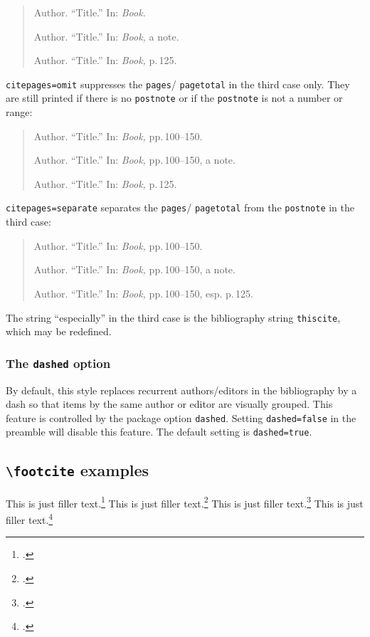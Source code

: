 \documentclass[a4paper]{article}
\newcommand{\cmd}[1]{\texttt{\textbackslash #1}}
\begin{document}
\begin{quote}
Author. \enquote{Title.} In: \emph{Book.}

Author. \enquote{Title.} In: \emph{Book,} a note.

Author. \enquote{Title.} In: \emph{Book,} p.\,125.
\end{quote}
%
\texttt{citepages=omit} suppresses the \texttt{pages}\slash
\texttt{pagetotal} in the third case only. They are still printed if
there is no \texttt{postnote} or if the \texttt{postnote} is not a
number or range:

\begin{quote}
Author. \enquote{Title.} In: \emph{Book,} pp.\,100--150.

Author. \enquote{Title.} In: \emph{Book,} pp.\,100--150, a note.

Author. \enquote{Title.} In: \emph{Book,} p.\,125.
\end{quote}
%
\texttt{citepages=separate} separates the \texttt{pages}\slash
\texttt{pagetotal} from the \texttt{postnote} in the third case:

\begin{quote}
Author. \enquote{Title.} In: \emph{Book,} pp.\,100--150.

Author. \enquote{Title.} In: \emph{Book,} pp.\,100--150, a note.

Author. \enquote{Title.} In: \emph{Book,} pp.\,100--150, esp. p.\,125.
\end{quote}
%
The string \enquote{especially} in the third case is the bibliography
string \texttt{thiscite}, which may be redefined.

\subsubsection*{The \texttt{dashed} option}

By default, this style replaces recurrent authors/editors in the
bibliography by a dash so that items by the same author or editor
are visually grouped. This feature is controlled by the package
option \texttt{dashed}. Setting \texttt{dashed=false} in the
preamble will disable this feature. The default setting is
\texttt{dashed=true}.

\clearpage

\subsection*{\cmd{footcite} examples}

This is just filler text.\footcite{aristotle:anima}
This is just filler text.\footcite{aristotle:physics}
This is just filler text.\footcite{aristotle:anima}
This is just filler text.\footcite{aristotle:physics}
\end{document}
